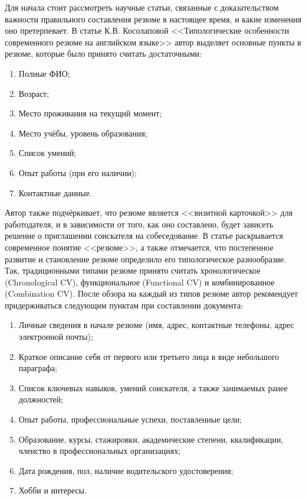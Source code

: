\documentclass[master, och, diploma]{SCWorks}
\begin{document}
Для начала стоит рассмотреть научные статьи, связанные с доказательством важности правильного составления резюме в настоящее время, и какие изменения  оно претерпевает. В статье К.В. Косолаповой <<Типологические особенности современного резюме на английском языке>> автор выделяет основные пункты в резюме, которые было принято считать достаточными:
\begin{enumerate}
    \item Полные ФИО;
    \item Возраст;
    \item Место проживания на текущий момент;
    \item Место учёбы, уровень образования;
    \item Список умений;
    \item Опыт работы (при его наличии);
    \item Контактные данные.
\end{enumerate}

Автор также подчёркивает, что резюме является <<визитной карточкой>> для работодателя, и в зависимости от того, как оно составлено, будет зависеть решение о приглашении соискателя на собеседование. В статье раскрывается современное понятие <<резюме>>, а также отмечается, что постепенное развитие и становление резюме определило его типологическое разнообразие. Так, традиционными типами резюме принято считать хронологическое (Chronological CV), функциональное (Functional CV) и комбинированное (Combination CV). После обзора на каждый из типов резюме автор рекомендует придерживаться следующим пунктам при составлении документа:
\begin{enumerate}
    \item Личные сведения в начале резюме (имя, адрес, контактные телефоны, адрес электронной почты); 
    \item Краткое описание себя от первого или третьего лица в виде небольшого параграфа;
    \item Список ключевых навыков, умений соискателя, а также занимаемых ранее должностей;
    \item Опыт работы, профессиональные успехи, поставленные цели;
    \item Образование, курсы, стажировки, академические степени, квалификации, членство в профессиональных организациях; 
    \item Дата рождения, пол, наличие водительского удостоверения; 
    \item Хобби и интересы.
\end{enumerate}
\end{document}
